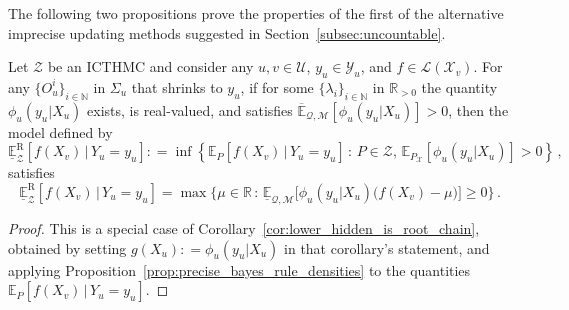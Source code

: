 \documentclass[twoside,11pt]{article}
\newcommand{\nats}{\mathbb{N}}
\newcommand{\reals}{\mathbb{R}}
\newcommand{\realspos}{\reals_{>0}}
\newcommand{\states}{\mathcal{X}}
\newcommand{\observs}{\mathcal{Y}}
\newcommand{\lexp}{\underline{\mathbb{E}}_{\rateset,\mathcal{M}}}
\newcommand{\uexp}{\overline{\mathbb{E}}_{\rateset,\mathcal{M}}}
\newcommand{\gambles}{\mathcal{L}}
\newcommand{\rateset}{\mathcal{Q}}
\newcommand{\coloneqq}{:\!=}
\begin{document}
The following two propositions prove the properties of the first of the alternative imprecise updating methods suggested in Section~\ref{subsec:uncountable}.
\begin{proposition}\label{prop:regular_is_computable}
Let $\mathcal{Z}$ be an ICTHMC and consider any $u,v\in\mathcal{U}$, $y_u\in\observs_u$, and $f\in\gambles(\states_v)$. For any $\{O_u^i\}_{i\in\nats}$ in $\Sigma_u$ that shrinks to $y_u$, if for some $\{\lambda_i\}_{i\in\nats}$ in $\realspos$ the quantity $\phi_u(y_u\vert X_u)$ exists, is real-valued, and satisfies $\uexp[\phi_u(y_u\vert X_u)]>0$, then the model defined by
\begin{equation*}
\underline{\mathbb{E}}_\mathcal{Z}^\mathrm{R}[f(X_v)\,\vert\,Y_u=y_u] \coloneqq \inf\left\{\mathbb{E}_P[f(X_v)\,\vert\,Y_u=y_u]\,:\,P\in\mathcal{Z},\,\mathbb{E}_{P_\states}[\phi_u(y_u\vert X_u)]>0\right\}\,,
\end{equation*}
satisfies
\begin{equation*}
\underline{\mathbb{E}}_\mathcal{Z}^\mathrm{R}[f(X_v)\,\vert\,Y_u=y_u] = \max\{\mu\in\reals\,:\,\lexp\bigl[\phi_u(y_u\vert X_u)\bigl(f(X_v)-\mu\bigr)\bigr] \geq 0\}\,.
\end{equation*}
\end{proposition}
\begin{proof}
This is a special case of Corollary~\ref{cor:lower_hidden_is_root_chain}, obtained by setting $g(X_u)\coloneqq \phi_u(y_u\vert X_u)$ in that corollary's statement, and applying Proposition~\ref{prop:precise_bayes_rule_densities} to the quantities $\mathbb{E}_P[f(X_v)\,\vert\,Y_u=y_u]$.
\end{proof}
\end{document}
